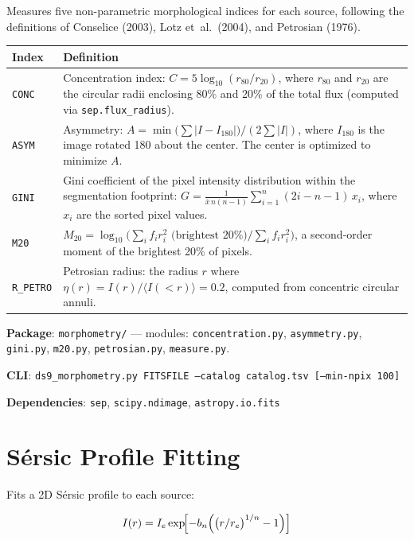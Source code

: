 \documentclass[11pt,fleqn]{book}
\begin{document}
Measures five non-parametric morphological indices for each source, following the definitions of Conselice (2003), Lotz et~al.\ (2004), and Petrosian (1976).

\begin{center}
\begin{longtable}{L{2.8cm} L{9.5cm}}
\toprule
\textbf{Index} & \textbf{Definition} \\
\midrule
\endhead
\texttt{CONC} & Concentration index: $C = 5\log_{10}(r_{80}/r_{20})$, where $r_{80}$ and $r_{20}$ are the circular radii enclosing 80\% and 20\% of the total flux (computed via \texttt{sep.flux\_radius}). \\
\midrule
\texttt{ASYM} & Asymmetry: $A = \min\!\bigl(\sum|I - I_{180}|\bigr) / (2\sum|I|)$, where $I_{180}$ is the image rotated 180\textdegree{} about the center. The center is optimized to minimize $A$. \\
\midrule
\texttt{GINI} & Gini coefficient of the pixel intensity distribution within the segmentation footprint: $G = \frac{1}{\bar{x}\,n(n-1)}\sum_{i=1}^{n}(2i - n - 1)\,x_i$, where $x_i$ are the sorted pixel values. \\
\midrule
\texttt{M20} & $M_{20} = \log_{10}\!\bigl(\sum_{i} f_i r_i^2 \text{ (brightest 20\%)} / \sum_{i} f_i r_i^2\bigr)$, a second-order moment of the brightest 20\% of pixels. \\
\midrule
\texttt{R\_PETRO} & Petrosian radius: the radius $r$ where $\eta(r) = I(r)/\langle I(<r)\rangle = 0.2$, computed from concentric circular annuli. \\
\bottomrule
\end{longtable}
\end{center}

\textbf{Package}: \texttt{morphometry/} --- modules: \texttt{concentration.py}, \texttt{asymmetry.py}, \texttt{gini.py}, \texttt{m20.py}, \texttt{petrosian.py}, \texttt{measure.py}.

\textbf{CLI}: \texttt{ds9\_morphometry.py FITSFILE --catalog catalog.tsv [--min-npix 100]}

\textbf{Dependencies}: \texttt{sep}, \texttt{scipy.ndimage}, \texttt{astropy.io.fits}


\section{S\'ersic Profile Fitting}

Fits a 2D S\'ersic profile to each source:

\begin{equation}
I(r) = I_e \exp\!\Bigl[-b_n\Bigl(\bigl(r/r_e\bigr)^{1/n} - 1\Bigr)\Bigr]
\end{equation}
\end{document}
